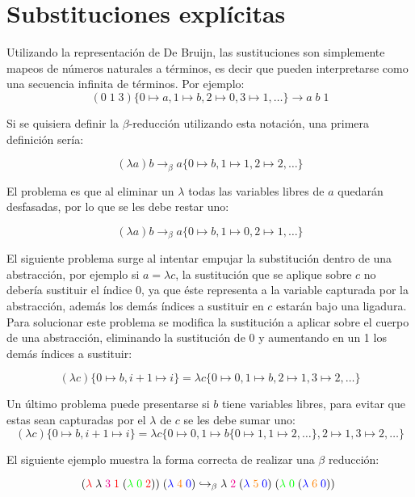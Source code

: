 \section{Substituciones explícitas}
Utilizando la representación de De Bruijn, las sustituciones son simplemente mapeos de números naturales a términos, es decir que pueden interpretarse como una secuencia infinita de términos.
Por ejemplo:
\[ (0\; 1\; 3)\{0\mapsto a, 1\mapsto b, 2\mapsto 0, 3\mapsto 1, \dots \} \rightarrow a\; b\; 1 \]

Si se quisiera definir la $\beta$-reducción utilizando esta notación, una primera definición sería:

\[ (\lambda a)b \rightarrow_{\beta} a \{ 0 \mapsto b, 1\mapsto 1, 2\mapsto 2, \dots \} \]

El problema es que al eliminar un $\lambda$ todas las variables libres de $a$ quedarán desfasadas, por lo que se les debe restar uno:

\[ (\lambda a)b \rightarrow_{\beta} a \{ 0 \mapsto b, 1\mapsto 0, 2\mapsto 1, \dots \} \]


El siguiente problema surge al intentar empujar la substitución dentro de una abstracción, por ejemplo si $a = \lambda c$, la sustitución que se aplique sobre $c$ no debería sustituir el índice 0, ya que  éste representa a la variable capturada por la abstracción, además los demás índices a sustituir en $c$ estarán bajo una ligadura.
Para solucionar este problema se modifica la sustitución a aplicar sobre el cuerpo de una abstracción, eliminando la sustitución de 0 y aumentando en un 1 los demás índices a sustituir:

\[ (\lambda c)\{ 0 \mapsto b, i+1\mapsto i \} = \lambda c \{ 0 \mapsto 0, 1 \mapsto b, 2\mapsto 1, 3\mapsto 2, \dots \} \]

Un último problema puede presentarse si $b$ tiene variables libres, para evitar que estas sean capturadas por el $\lambda$ de $c$ se les debe sumar uno:
\[ (\lambda c)\{ 0 \mapsto b, i+1\mapsto i \} = \lambda c \{ 0 \mapsto 0, 1 \mapsto b \{ 0\mapsto 1, 1\mapsto 2, \dots \}, 2\mapsto 1, 3\mapsto 2, \dots \} \]

El siguiente ejemplo muestra la forma correcta de realizar una $\beta$ reducción:

\[
(\textcolor{red}{\lambda}\; \lambda\; \textcolor{magenta}{3}\; \textcolor{red}{1}\; (\textcolor{green}{\lambda\; 0}\; \textcolor{red}{2}))\; (\textcolor{blue}{\lambda}\; \textcolor{orange}{4}\; \textcolor{blue}{0})
\hookrightarrow_\beta
\lambda \; \textcolor{magenta}{2} \; (\textcolor{blue}{\lambda}\; \textcolor{orange}{5}\; \textcolor{blue}{0})\; (\textcolor{green}{\lambda\; 0}\; (\textcolor{blue}{\lambda}\; \textcolor{orange}{6}\; \textcolor{blue}{0}))\;
\]

